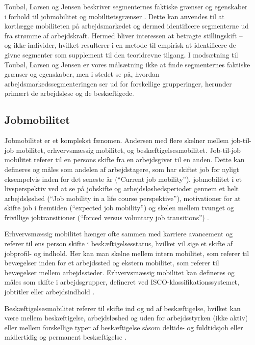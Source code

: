 Toubøl, Larsen og Jensen beskriver segmenternes faktiske grænser og egenskaber i forhold til jobmobilitet og mobilitetsgrænser \parencite[3]{Touboel2013}. Dette kan anvendes til at kortlægge mobiliteten på arbejdsmarkedet og dermed identificere segmenterne ud fra strømme af arbejdskraft. Hermed bliver interessen at betragte stillingskift – og ikke individer, hvilket resulterer i en metode til empirisk at identificere de givne segmenter som supplement til den teoridrevne tilgang. I modsætning til Toubøl, Larsen og Jensen er vores målsætning ikke at finde segmenternes faktiske grænser og egenskaber, men i stedet se på, hvordan arbejdsmarkedssegmenteringen ser ud for forskellige grupperinger, herunder primært de arbejdsløse og de beskæftigede.



\subsection{Jobmobilitet}

Jobmobilitet er et komplekst fænomen. Andersen med flere skelner mellem job-til-job mobilitet, erhvervsmæssig mobilitet,  og beskæftigelsesmobilitet. Job-til-job mobilitet referer til en persons skifte fra en arbejdsgiver til en anden. Dette kan defineres og måles som andelen af arbejdstagere, som har skiftet job for nyligt eksempelvis inden for det seneste år (“Current job mobility”), jobmobilitet i et livsperspektiv ved at se på jobskifte og arbejdsløshedsperioder gennem et helt arbejdsløshed (“Job mobility in a life course perspektive”), motivationer for at skifte job i fremtiden (“expected job mobility”) og skelen mellem tvunget og frivillige jobtransitioner (“forced versus voluntary job transitions”) \parencite[16]{Andersen2008}.

Erhvervsmæssig mobilitet hænger ofte sammen med karriere avancement og referer til ens person skifte i beskæftigelsesstatus, hvilket vil sige et skifte af jobprofil- og indhold. Her kan man skelne mellem intern mobilitet, som referer til bevægelser inden for et arbejdssted og ekstern mobilitet, som referer til bevægelser mellem arbejdssteder. Erhvervsmæssig mobilitet kan defineres og måles som skifte i arbejdsgrupper, defineret ved ISCO-klassifikationssystemet, jobtitler eller arbejdsindhold \parencite[17]{Andersen2008}.

Beskæftigelsesmobilitet referer til skifte ind og ud af beskæftigelse, hvilket kan være mellem beskæftigelse, arbejdsløshed  og uden for arbejdsstyrken (ikke aktiv) eller mellem forskellige typer af beskæftigelse såsom deltids- og fuldtidsjob eller midlertidig og permanent beskæftigelse \parencite[19]{Andersen2008}.


